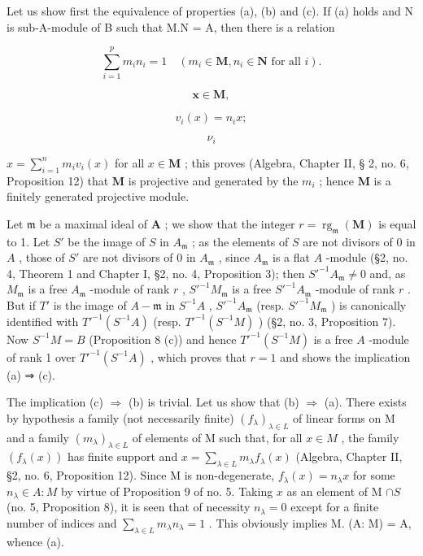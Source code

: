 Let us show first the equivalence of properties (a), (b) and (c). If (a) holds and N is sub-A-module of B such that M.N = A, then there is a relation

\[
\sum_ {i = 1} ^ {p} m _ {i} n _ {i} = 1 \quad (m _ {i} \in \mathbf {M}, n _ {i} \in \mathbf {N} \text {   for   all   } i).\tag{9}
\]

\[
\boldsymbol {x} \in \mathbf {M},
\]

\[
v _ {i} (x) = n _ {i} x;
\]

\[
\nu_ {i}
\]

\(x = \sum_{i=1}^{n} m_i v_i(x)\) for all \(x \in \mathbf{M}\) ; this proves (Algebra, Chapter II, § 2, no. 6, Proposition 12) that \(\mathbf{M}\) is projective and generated by the \(m_i\) ; hence \(\mathbf{M}\) is a finitely generated projective module.

Let \(\mathfrak{m}\) be a maximal ideal of \(\mathbf{A}\) ; we show that the integer \(r = \operatorname{rg}_{\mathfrak{m}}(\mathbf{M})\) is equal to 1. Let \(S'\) be the image of \(S\) in \(A_{\mathfrak{m}}\) ; as the elements of \(S\) are not divisors of 0 in \(A\) , those of \(S'\) are not divisors of 0 in \(A_{\mathfrak{m}}\) , since \(A_{\mathfrak{m}}\) is a flat \(A\) -module (§2, no. 4, Theorem 1 and Chapter I, §2, no. 4, Proposition 3); then \(S'^{-1}A_{\mathfrak{m}} \neq 0\) and, as \(M_{\mathfrak{m}}\) is a free \(A_{\mathfrak{m}}\) -module of rank \(r\) , \(S'^{-1}M_{\mathfrak{m}}\) is a free \(S'^{-1}A_{\mathfrak{m}}\) -module of rank \(r\) . But if \(T'\) is the image of \(A - \mathfrak{m}\) in \(S^{-1}A\) , \(S'^{-1}A_{\mathfrak{m}}\) (resp. \(S'^{-1}M_{\mathfrak{m}}\) ) is canonically identified with \(T'^{-1}(S^{-1}A)\) (resp. \(T'^{-1}(S^{-1}M)\) ) (§2, no. 3, Proposition 7). Now \(S^{-1}M = B\) (Proposition 8 (c)) and hence \(T'^{-1}(S^{-1}M)\) is a free \(A\) -module of rank 1 over \(T'^{-1}(S^{-1}A)\) , which proves that \(r = 1\) and shows the implication (a) ⇒ (c).

The implication (c) \(\Rightarrow\) (b) is trivial. Let us show that (b) \(\Rightarrow\) (a). There exists by hypothesis a family (not necessarily finite) \((f_{\lambda})_{\lambda \in L}\) of linear forms on M and a family \((m_{\lambda})_{\lambda \in L}\) of elements of M such that, for all \(x \in M\) , the family \((f_{\lambda}(x))\) has finite support and \(x = \sum_{\lambda \in L} m_{\lambda} f_{\lambda}(x)\) (Algebra, Chapter II, §2, no. 6, Proposition 12). Since M is non-degenerate, \(f_{\lambda}(x) = n_{\lambda} x\) for some \(n_{\lambda} \in A: M\) by virtue of Proposition 9 of no. 5. Taking \(x\) as an element of M \(\cap S\) (no. 5, Proposition 8), it is seen that of necessity \(n_{\lambda} = 0\) except for a finite number of indices and \(\sum_{\lambda \in L} m_{\lambda} n_{\lambda} = 1\) . This obviously implies M. (A: M) = A, whence (a).

